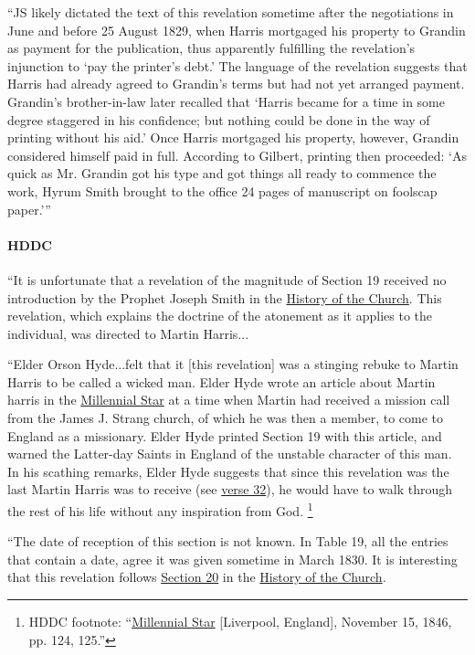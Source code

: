 			``JS likely dictated the text of this revelation sometime after the negotiations in June and before 25 August 1829, when Harris mortgaged his property to Grandin as payment for the publication, thus apparently fulfilling the revelation's injunction to `pay the printer's debt.' The language of the revelation suggests that Harris had already agreed to Grandin's terms but had not yet arranged payment. Grandin's brother-in-law later recalled that `Harris became for a time in some degree staggered in his confidence; but nothing could be done in the way of printing without his aid.' Once Harris mortgaged his property, however, Grandin considered himself paid in full. According to Gilbert, printing then proceeded: `As quick as Mr. Grandin got his type and got things all ready to commence the work, Hyrum Smith brought to the office 24 pages of manuscript on foolscap paper.'''
			
		\paragraph{HDDC}
		
			``It is unfortunate that a revelation of the magnitude of Section 19 received no introduction by the Prophet Joseph Smith in the \uline{History of the Church}. This revelation, which explains the doctrine of the atonement as it applies to the individual, was directed to Martin Harris...
			
			``Elder Orson Hyde...felt that it [this revelation] was a stinging rebuke to Martin Harris to be called a wicked man. Elder Hyde wrote an article about Martin harris in the \uline{Millennial Star} at a time when Martin had received a mission call from the James J. Strang church, of which he was then a member, to come to England as a missionary. Elder Hyde printed Section 19 with this article, and warned the Latter-day Saints in England of the unstable character of this man. In his scathing remarks, Elder Hyde suggests that since this revelation was the last Martin Harris was to receive (see \hyperref[DC19-32]{verse 32}), he would have to walk through the rest of his life without any inspiration from God.%
				\footnote{%
					HDDC footnote: ``\uline{Millennial Star} [Liverpool, England], November 15, 1846, pp. 124, 125.''
					}
			
			``The date of reception of this section is not known. In Table 19, all the entries that contain a date, agree it was given sometime in March 1830. It is interesting that this revelation follows \hyperref[DC20]{Section 20} in the \uline{History of the Church}.
			
